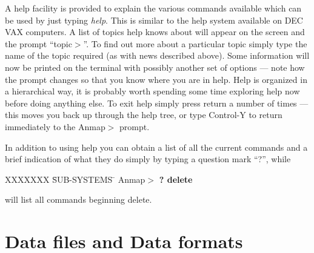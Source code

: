 A help facility is provided to explain the various commands
available which can be used by just typing {\em help}.
This is similar to the help system available on DEC VAX computers.
A list of topics help knows about will appear on the
screen and the prompt ``topic$>$''. To find out more about a
particular topic simply type the name of the topic required
(as with news described above). Some information will now be
printed on the terminal with possibly another set of options
--- note how the prompt changes so that you know where you are
in help. Help is organized in a hierarchical way, it is
probably worth spending some time exploring help now before
doing anything else. To exit help simply press return a number
of times --- this moves you back up through the help tree, or
type Control-Y to return immediately to the Anmap$>$ prompt.
 
In addition to using help you can obtain a list of all the
current commands and a brief indication of what they do simply
by typing a question mark ``?'', while
\begin{tabbing}
XXXXXXX \= SUB-SYSTEMS \= \kill
\> Anmap$>$ {\bf ? delete}
\end{tabbing}
will list all commands beginning delete.

\section{Data files and Data formats}

